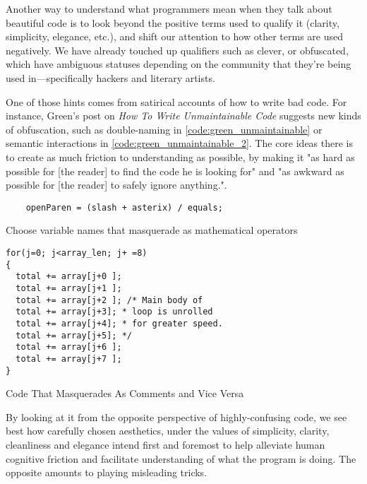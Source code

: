 \vspace*{1\baselineskip}

Another way to understand what programmers mean when they talk about beautiful code is to look beyond the positive terms used to qualify it (clarity, simplicity, elegance, etc.), and shift our attention to how other terms are used negatively. We have already touched up qualifiers such as clever, or obfuscated, which have ambiguous statuses depending on the community that they're being used in—specifically hackers and literary artists.

One of those hints comes from satirical accounts of how to write bad code. For instance, Green's post on \emph{ How To Write Unmaintainable Code} suggests new kinds of obfuscation, such as double-naming in \ref{code:green_unmaintainable} or semantic interactions in \ref{code:green_unmaintainable_2}. The core ideas there is to create as much friction to understanding as possible, by making it "as hard as possible for [the reader] to find the code he is looking for" and "as awkward as possible for [the reader] to safely ignore anything."\cite{green_how_2006}.

\begin{listing}
  \begin{verbatim}
    openParen = (slash + asterix) / equals; 
  \end{verbatim}
  \caption{Choose variable names that masquerade as mathematical operators}
  \label{code:green_unmaintainable}
\end{listing}

\begin{listing}
  \begin{verbatim}
for(j=0; j<array_len; j+ =8)
{
  total += array[j+0 ];
  total += array[j+1 ];
  total += array[j+2 ]; /* Main body of
  total += array[j+3]; * loop is unrolled
  total += array[j+4]; * for greater speed.
  total += array[j+5]; */
  total += array[j+6 ];
  total += array[j+7 ];
} 
\end{verbatim}
  \caption{Code That Masquerades As Comments and Vice Versa}
  \label{code:green_unmaintainable_2}
\end{listing}

By looking at it from the opposite perspective of highly-confusing code, we see best how carefully chosen aesthetics, under the values of simplicity, clarity, cleanliness and elegance intend first and foremost to help alleviate human cognitive friction and facilitate understanding of what the program is doing. The opposite amounts to playing misleading tricks.


